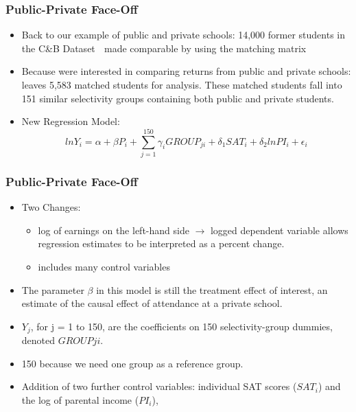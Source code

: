 \documentclass{beamer}
\begin{document}
\begin{frame}
\frametitle{Public-Private Face-Off}

\begin{itemize}
	\item Back to our example of public and private schools: 14,000 former students in the C&B Dataset  made comparable by using the matching matrix
	\item	Because were interested in comparing returns from public and private schools: leaves 5,583 matched students for analysis. These matched students fall into 151 similar selectivity groups containing both public and private students.
	\item New Regression Model:
	$$ln Y_i=\alpha + \beta P_i +\sum^{150}_{j=1}\gamma_i GROUP_{ji} + \delta_1SAT_i +\delta_2 ln PI_i + \epsilon_i$$
\end{itemize}

\end{frame}

\begin{frame}
\frametitle{Public-Private Face-Off}
\begin{itemize}
	\item Two Changes:
		\begin{itemize}
			\item[\bullet] log of earnings on the left-hand side $\rightarrow$ logged dependent variable allows regression estimates to be interpreted as a percent change.
			\item[\bullet] includes many control variables
		\end{itemize}
	\item The parameter $\beta$ in this model is still the treatment effect of interest, an estimate of the causal effect of attendance at a private school.
	\item $Y_j$, for j = 1 to 150, are the coefficients on 150 selectivity-group dummies, denoted $GROUP{ji}$.
	\item 150 because we need one group as a reference group.
	\item Addition of two further control variables: individual SAT scores ($SAT_i$) and the log of parental income ($PI_i$),
\end{itemize}

\end{frame}
\end{document}
